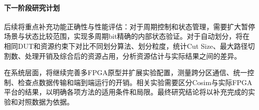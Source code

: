 \paragraph{下一阶段研究计划}

后续将重点补充功能正确性与性能评估：对于周期控制和状态管理，需要扩大暂停场景与状态比较范围，实现多周期bit精确的内部状态验证。对于自动划分，将在相同DUT和资源约束下对比不同划分算法、划分粒度，统计Cut Size、最大路径切割数、处理开销及综合后的资源占用，分析资源估计与实际结果之间的差异。

在系统层面，将继续完善多FPGA原型并扩展实验配置，测量跨分区通信、统一控制、检查点数据传输和端到端运行的开销。相关实验需要区分Cosim与实际FPGA平台的结果，以明确各项方法的适用条件和局限。最终研究结论将以补充完成的实验和对照数据为依据。

